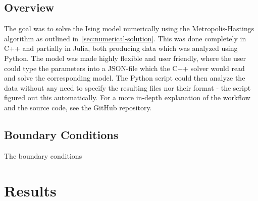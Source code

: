 \documentclass[aps,reprint]{revtex4-1}
\begin{document}
\subsection{Overview}
\label{sec:overview}


The goal was to solve the Ising model numerically using the Metropolis-Hastings
algorithm as outlined in~\ref{sec:numerical-solution}. This was done completely
in C++ and partially in Julia, both producing data which was analyzed using
Python. The model was made highly flexible and user friendly, where the user could
type the parameters into a JSON-file which the C++ solver would read and solve
the corresponding model.
The Python script could then analyze the data without any need to specify the
resulting files nor their format - the script figured out this automatically.
For a more in-depth explanation of the workflow and the source code, see the
GitHub repository.

\subsection{Boundary Conditions}
\label{sec:boundary-conditions}

The boundary conditions 
\section{Results}
\label{sec:results}
\end{document}

